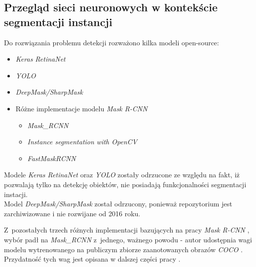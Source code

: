 \subsection{Przegląd sieci neuronowych w kontekście segmentacji instancji}

Do rozwiązania problemu detekcji rozważono kilka modeli open-source:

\begin{itemize}
	\item \textit{Keras RetinaNet} \cite{keras-retinanet} \cite{keras-retinanet-implementation}
	\item \textit{YOLO} \cite{yolo} \cite{yolo-implementation}
	\item \textit{DeepMask/SharpMask} \cite{deepmask} \cite{sharpmask} \cite{deep-sharp-mask}
	\item Różne implementacje modelu \textit{Mask R-CNN} \cite{general-mask-rcnn}
		\begin{itemize}
			\item \textit{Mask\_RCNN} \cite{matterport-mask-rcnn}
			\item \textit{Instance segmentation with OpenCV} \cite{mask-rcnn-opencv}
			\item \textit{FastMaskRCNN} \cite{fast-mask-rcnn}
		\end{itemize}
\end{itemize}

Modele \textit{Keras RetinaNet} oraz \textit{YOLO} zostały odrzucone ze względu na fakt, iż pozwalają tylko na detekcję obiektów, nie posiadają funkcjonalności segmentacji instacji. \\

Model \textit{DeepMask/SharpMask} został odrzucony, ponieważ repozytorium jest zarchiwizowane i nie rozwijane od 2016 roku.

Z~pozostałych trzech różnych implementacji bazujących na pracy \textit{Mask R-CNN} \cite{general-mask-rcnn}, wybór padł na \textit{Mask\_RCNN} \cite{matterport-mask-rcnn} z~jednego, ważnego powodu - autor udostępnia wagi modelu wytrenowanego na publiczym zbiorze zaanotowanych obrazów \textit{COCO} \cite{coco}.
Przydatność tych wag jest opisana w dalszej części pracy .
